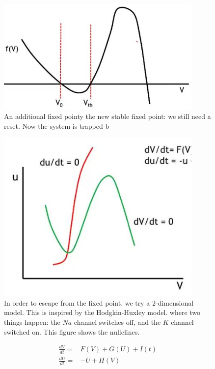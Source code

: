 \documentclass[]{article}
\begin{document}
\begin{figure}[H]
	\caption[An additional fixed point]{An additional fixed pointy the new stable fixed point: we still need a reset. Now the system is trapped b}
	\includegraphics[width=0.9\textwidth]{3fp}
\end{figure}

\begin{figure}[H]
	\caption[In order to escape from the fixed point, try a 2-dimensional model]{In order to escape from the fixed point, we try a 2-dimensional model. This is inspired by the Hodgkin-Huxley model. where two things happen: the $Na$ channel switches off, and the $K$ channel switched on. This figure shows the nullclines.}
	\includegraphics[width=0.9\textwidth]{2d}
\end{figure}

\begin{align*}
	\frac{dV}{dt} =& F(V) + G(U) +I(t)\\
	\frac{dU}{dt} =& -U + H(V)
\end{align*}
\end{document}
